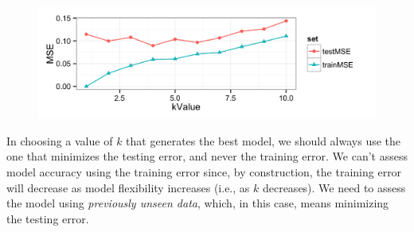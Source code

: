\documentclass[11pt]{exam} %
\begin{document}
\begin{questions}
\begin{parts}
\begin{figure}[H]
	\centering
	\includegraphics[width=6in]{5d.png}
\end{figure}

In choosing a value of $k$ that generates the best model, we should always use the one that minimizes the testing error, and never the training error. We can't assess model accuracy using the training error since, by construction, the training error will decrease as model flexibility increases (i.e., as $k$ decreases). We need to assess the model using \textit{previously unseen data}, which, in this case, means minimizing the testing error.

\end{parts}


%
%
%



\end{questions}

\end{document}
